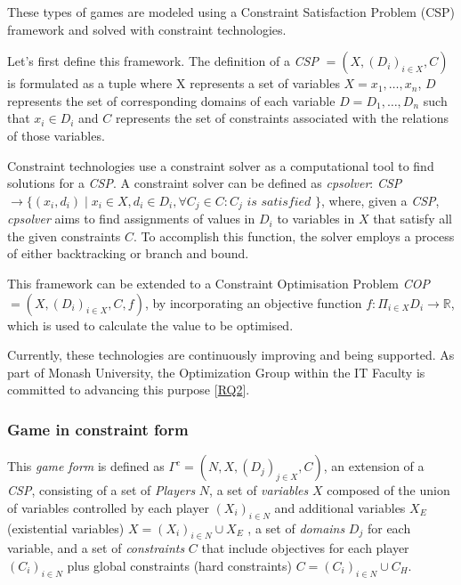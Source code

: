 \documentclass{article}
\begin{document}
These types of games are modeled using a Constraint Satisfaction Problem (CSP) framework and solved with constraint technologies.

Let's first define this framework. The definition of a \textit{CSP} $ = (X,(D_i)_{i \in X},C)$ is formulated as a tuple where X represents a set of variables $X = {x_1,\ldots, x_n}$, $D$ represents the set of corresponding domains of each variable $D = {D_1,\ldots,D_n}$ such that $x_i \in D_i$ and $C$ represents the set of constraints associated with the relations of those variables. \cite{apt:2003}

Constraint technologies use a constraint solver as a computational tool to find solutions for a \textit{CSP}. A constraint solver can be defined as \textit{cpsolver}: \textit{CSP} $ \rightarrow \{(x_i,d_i) \mid x_i \in X, d_i \in D_i, \forall C_j \in C : C_j \textit{ is satisfied }\}$, where, given a \textit{CSP}, \textit{cpsolver} aims to find assignments of values in $D_i$ to variables in $X$ that satisfy all the given constraints $C$. To accomplish this function, the solver employs a process of either backtracking or branch and bound. \cite{rossi:2006}

This framework can be extended to a Constraint Optimisation Problem \textit{COP} $ = (X,(D_i)_{i \in X},C,f)$, by incorporating an objective function $f:\Pi_{i \in X}D_i \rightarrow \mathbb{R}$, which is used to calculate the value to be optimised.

Currently, these technologies are continuously improving and being supported. As part of Monash University, the Optimization Group within the IT Faculty is committed to advancing this purpose [\hyperref[sec:rq]{RQ2}].

\subsubsection{Game in constraint form} 
This \textit{game form} is defined as $\Gamma^c = (N,X,(D_j)_{j \in X}, C)$, an extension of a \textit{CSP}, consisting of a set of  \textit{Players} $N$, a set of \textit{variables} $X$ composed of the union of variables controlled by each player $(X_i)_{i \in N}$ and additional variables $X_E$ (existential variables) $X=(X_i)_{i \in N} \cup X_{E}$ , a set of \textit{domains} $D_j$ for each variable, and a set of \textit{constraints} $C$ that include objectives for each player $(C_i)_{i \in N}$ plus global constraints (hard constraints) $C=(C_i)_{i \in N} \cup C_{H}$.  \cite{nguyen:2015,palmieri:2019}
\end{document}
